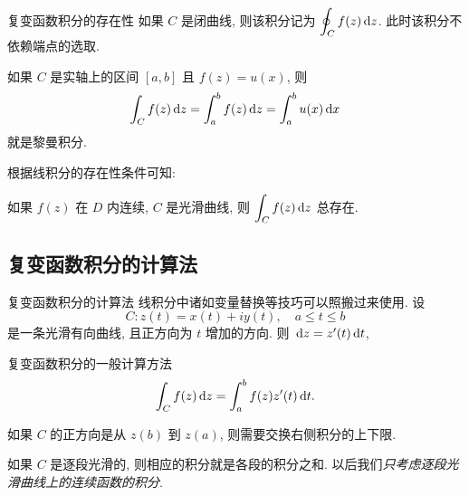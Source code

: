 \begin{frame}{复变函数积分的存在性}
	\onslide<+->
	如果 $C$ 是闭曲线, 则该积分记为 \alert{$\displaystyle\oint_Cf(z)\,\mathrm{d} z$}.
	\onslide<+->
	此时该积分不依赖端点的选取.

	\onslide<+->
	如果 $C$ 是实轴上的区间 $[a,b]$ 且 $f(z)=u(x)$, 
	\onslide<+->
	则
	\[\int_Cf(z)\,\mathrm{d} z=\int_a^bf(z)\,\mathrm{d} z=\int_a^b u(x)\,\mathrm{d} x\]
	就是黎曼积分.

	\onslide<+->
	根据线积分的存在性条件可知:
	\onslide<+->
	\begin{theorem}
	如果 $f(z)$ 在 $D$ 内连续, $C$ 是光滑曲线, 则 $\displaystyle\int_Cf(z)\,\mathrm{d} z$ 总存在.
	\end{theorem}
\end{frame}


\subsection{复变函数积分的计算法}

\begin{frame}{复变函数积分的计算法}
	\onslide<+->
	线积分中诸如变量替换等技巧可以照搬过来使用.
	\onslide<+->
	设
	\[C:z(t)=x(t)+iy(t),\quad a\le t\le b\]
	是一条光滑有向曲线, 且正方向为 $t$ 增加的方向.
	\onslide<+->
	则 $\,\mathrm{d} z=z'(t)\,\mathrm{d} t$,

	\onslide<+->
	\begin{alertblock}{复变函数积分的一般计算方法}
		\[\int_Cf(z)\,\mathrm{d} z=\int_a^b f(z)z'(t)\,\mathrm{d} t.\]
	\end{alertblock}
	\onslide<+->
	\noindent 如果 $C$ 的正方向是从 $z(b)$ 到 $z(a)$, 则需要交换右侧积分的上下限.

	\onslide<+->
	如果 $C$ 是逐段光滑的, 则相应的积分就是各段的积分之和.
	\onslide<+->
	以后我们\emph{只考虑逐段光滑曲线上的连续函数的积分}.
\end{frame}


